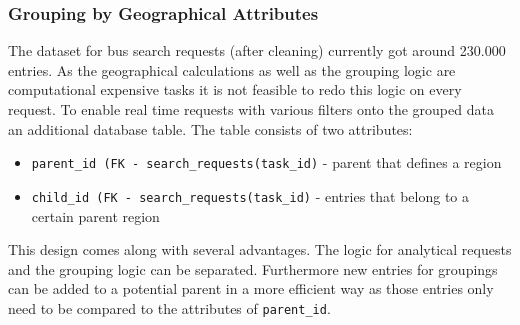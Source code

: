 \subsubsection{Grouping by Geographical Attributes}
The dataset for bus search requests (after cleaning) currently got around 230.000 entries. As the geographical calculations as well as the grouping logic are computational expensive tasks it is not feasible to redo this logic on every request. To enable real time requests with various filters onto the grouped data an additional database table. The table consists of two attributes: 
\begin{itemize}
\item \verb|parent_id (FK - search_requests(task_id)| - parent that defines a region 
\item \verb|child_id (FK - search_requests(task_id)| - entries that belong to a certain parent region  
\end{itemize}
This design comes along with several advantages. The logic for analytical requests and the grouping logic can be separated. Furthermore new entries for groupings can be added to a potential parent in a more efficient way as those entries only need to be compared to the attributes of \verb|parent_id|.

